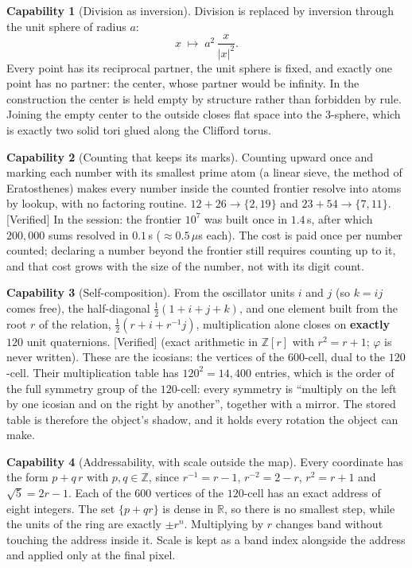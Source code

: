 \documentclass[11pt]{article}
\newcommand{\verified}{\textsf{\small\textcolor{verif}{[Verified]}}}
\newcommand{\Z}{\mathbb{Z}}
\newcommand{\R}{\mathbb{R}}
\theoremstyle{definition}\newtheorem{claim}{Capability}
\theoremstyle{remark}
\begin{document}
\begin{claim}[Division as inversion]\label{c:inv}
Division is replaced by inversion through the unit sphere of radius $a$:
\[
x\;\mapsto\;a^2\,\frac{x}{|x|^2}.
\]
Every point has its reciprocal partner, the unit sphere is fixed, and exactly one point has no partner: the center, whose partner would be infinity. In the construction the center is held empty by structure rather than forbidden by rule. Joining the empty center to the outside closes flat space into the $3$-sphere, which is exactly two solid tori glued along the Clifford torus.
\end{claim}

\begin{claim}[Counting that keeps its marks]\label{c:marks}
Counting upward once and marking each number with its smallest prime atom (a linear sieve, the method of Eratosthenes) makes every number inside the counted frontier resolve into atoms by lookup, with no factoring routine. $12+26\to\{2,19\}$ and $23+54\to\{7,11\}$. \verified{} In the session: the frontier $10^7$ was built once in $1.4$\,s, after which $200{,}000$ sums resolved in $0.1$\,s ($\approx 0.5\,\mu$s each). The cost is paid once per number counted; declaring a number beyond the frontier still requires counting up to it, and that cost grows with the size of the number, not with its digit count.
\end{claim}

\begin{claim}[Self-composition]\label{c:closure}
From the oscillator units $i$ and $j$ (so $k=ij$ comes free), the half-diagonal $\tfrac12(1+i+j+k)$, and one element built from the root $r$ of the relation, $\tfrac12(r+i+r^{-1}j)$, multiplication alone closes on \textbf{exactly $120$} unit quaternions. \verified{} (exact arithmetic in $\Z[r]$ with $r^2=r+1$; $\varphi$ is never written). These are the icosians: the vertices of the $600$-cell, dual to the $120$-cell. Their multiplication table has $120^2=14{,}400$ entries, which is the order of the full symmetry group of the $120$-cell: every symmetry is ``multiply on the left by one icosian and on the right by another'', together with a mirror. The stored table is therefore the object's shadow, and it holds every rotation the object can make.
\end{claim}

\begin{claim}[Addressability, with scale outside the map]\label{c:addr}
Every coordinate has the form $p+q\,r$ with $p,q\in\Z$, since $r^{-1}=r-1$, $r^{-2}=2-r$, $r^2=r+1$ and $\sqrt5=2r-1$. Each of the $600$ vertices of the $120$-cell has an exact address of eight integers. The set $\{p+qr\}$ is dense in $\R$, so there is no smallest step, while the units of the ring are exactly $\pm r^n$. Multiplying by $r$ changes band without touching the address inside it. Scale is kept as a band index alongside the address and applied only at the final pixel.
\end{claim}
\end{document}
